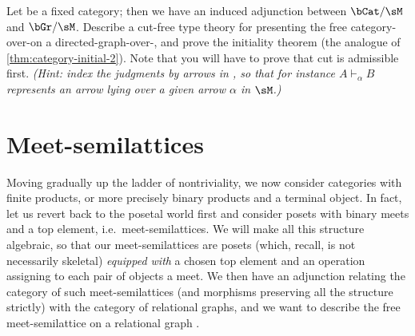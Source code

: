 \documentclass{book}
\let\types\vdash
\begin{document}

\begin{ex}\label{ex:categories-over}
  Let \sM be a fixed category; then we have an induced adjunction between $\bCat/\sM$ and $\bGr/\sM$.
  Describe a cut-free type theory for presenting the free category-over-\sM on a directed-graph-over-\sM, and prove the initiality theorem (the analogue of \cref{thm:category-initial-2}).
  Note that you will have to prove that cut is admissible first.
  \textit{(Hint: index the judgments by arrows in \sM, so that for instance $A\types_\alpha B$ represents an arrow lying over a given arrow $\alpha$ in $\sM$.)}
\end{ex}


\section{Meet-semilattices}
\label{sec:mslat}

Moving gradually up the ladder of nontriviality, we now consider categories with finite products, or more precisely binary products and a terminal object.
In fact, let us revert back to the posetal world first and consider posets with binary meets and a top element, i.e.\ meet-semilattices.
We will make all this structure algebraic, so that our meet-semilattices are posets (which, recall, is not necessarily skeletal) \emph{equipped with} a chosen top element and an operation assigning to each pair of objects a meet.
We then have an adjunction relating the category \bmSLat of such meet-semilattices (and morphisms preserving all the structure strictly) with the category \bRelGr of relational graphs, and we want to describe the free meet-semilattice on a relational graph \cG.
\end{document}
